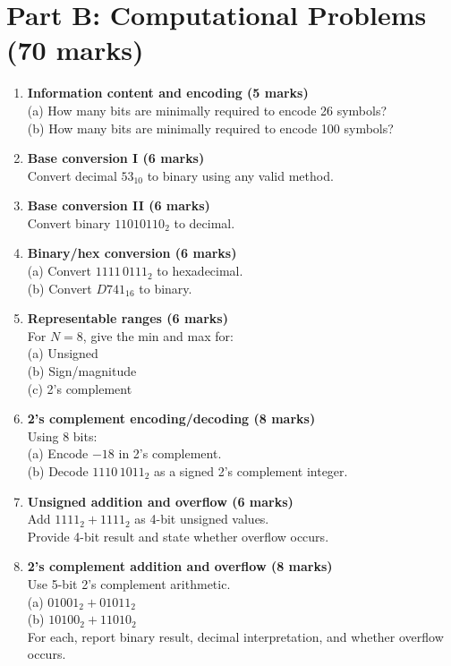 \documentclass[11pt]{article}
\begin{document}
\section*{Part B: Computational Problems (70 marks)}
\begin{enumerate}[label=\textbf{B\arabic*.}]
  \item \textbf{Information content and encoding (5 marks)}\\
  (a) How many bits are minimally required to encode 26 symbols?\\
  (b) How many bits are minimally required to encode 100 symbols?

  \item \textbf{Base conversion I (6 marks)}\\
  Convert decimal \(53_{10}\) to binary using any valid method.

  \item \textbf{Base conversion II (6 marks)}\\
  Convert binary \(11010110_2\) to decimal.

  \item \textbf{Binary/hex conversion (6 marks)}\\
  (a) Convert \(1111\,0111_2\) to hexadecimal.\\
  (b) Convert \(D741_{16}\) to binary.

  \item \textbf{Representable ranges (6 marks)}\\
  For \(N=8\), give the min and max for:\\
  (a) Unsigned\\
  (b) Sign/magnitude\\
  (c) 2's complement

  \item \textbf{2's complement encoding/decoding (8 marks)}\\
  Using 8 bits:\\
  (a) Encode \(-18\) in 2's complement.\\
  (b) Decode \(1110\,1011_2\) as a signed 2's complement integer.

  \item \textbf{Unsigned addition and overflow (6 marks)}\\
  Add \(1111_2 + 1111_2\) as 4-bit unsigned values.\\
  Provide 4-bit result and state whether overflow occurs.

  \item \textbf{2's complement addition and overflow (8 marks)}\\
  Use 5-bit 2's complement arithmetic.\\
  (a) \(01001_2 + 01011_2\)\\
  (b) \(10100_2 + 11010_2\)\\
  For each, report binary result, decimal interpretation, and whether overflow occurs.


\end{enumerate}
\end{document}
